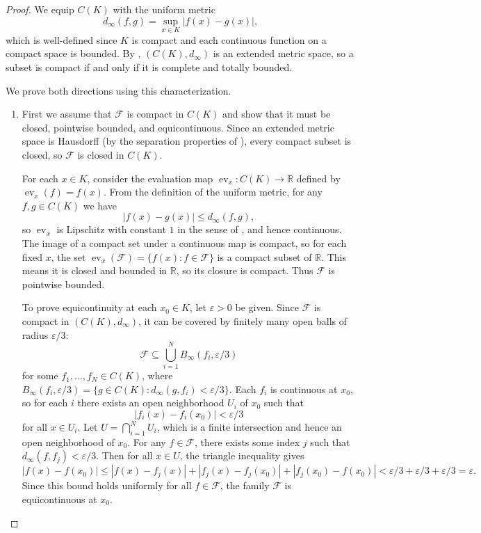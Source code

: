 \begin{proof}
We equip $C(K)$ with the uniform metric $$d_\infty(f,g) = \sup_{x \in K} |f(x) - g(x)|,$$ which is well-defined since $K$ is compact and each continuous function on a compact space is bounded. By , $(C(K), d_\infty)$ is an extended metric space, so a subset is compact if and only if it is complete and totally bounded.

We prove both directions using this characterization.

\begin{enumerate}
    \item First we assume that $\mathcal{F}$ is compact in $C(K)$ and show that it must be closed, pointwise bounded, and equicontinuous. Since an extended metric space is Hausdorff (by the separation properties of ), every compact subset is closed, so $\mathcal{F}$ is closed in $C(K)$.

    For each $x \in K$, consider the evaluation map $\operatorname{ev}_x : C(K) \to \mathbb{R}$ defined by $\operatorname{ev}_x(f) = f(x)$. From the definition of the uniform metric, for any $f,g \in C(K)$ we have $$|f(x) - g(x)| \leq d_\infty(f,g),$$ so $\operatorname{ev}_x$ is Lipschitz with constant $1$ in the sense of , and hence continuous. The image of a compact set under a continuous map is compact, so for each fixed $x$, the set $\operatorname{ev}_x(\mathcal{F}) = \{f(x) : f \in \mathcal{F}\}$ is a compact subset of $\mathbb{R}$. This means it is closed and bounded in $\mathbb{R}$, so its closure is compact. Thus $\mathcal{F}$ is pointwise bounded.

    To prove equicontinuity at each $x_0 \in K$, let $\varepsilon > 0$ be given. Since $\mathcal{F}$ is compact in $(C(K), d_\infty)$, it can be covered by finitely many open balls of radius $\varepsilon/3$: $$\mathcal{F} \subseteq \bigcup_{i=1}^N B_\infty(f_i, \varepsilon/3)$$ for some $f_1, \dots, f_N \in C(K)$, where $B_\infty(f_i, \varepsilon/3) = \{g \in C(K) : d_\infty(g,f_i) < \varepsilon/3\}$. Each $f_i$ is continuous at $x_0$, so for each $i$ there exists an open neighborhood $U_i$ of $x_0$ such that $$|f_i(x) - f_i(x_0)| < \varepsilon/3$$ for all $x \in U_i$. Let $U = \bigcap_{i=1}^N U_i$, which is a finite intersection and hence an open neighborhood of $x_0$. For any $f \in \mathcal{F}$, there exists some index $j$ such that $d_\infty(f,f_j) < \varepsilon/3$. Then for all $x \in U$, the triangle inequality gives $$|f(x) - f(x_0)| \leq |f(x) - f_j(x)| + |f_j(x) - f_j(x_0)| + |f_j(x_0) - f(x_0)| < \varepsilon/3 + \varepsilon/3 + \varepsilon/3 = \varepsilon.$$ Since this bound holds uniformly for all $f \in \mathcal{F}$, the family $\mathcal{F}$ is equicontinuous at $x_0$.


\end{enumerate}
\end{proof}
